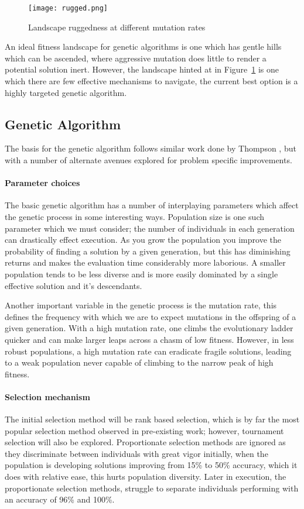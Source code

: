 \begin{figure}
	\centering
	\texttt{[image: rugged.png]}
	\caption{Landscape ruggedness at different mutation rates}
	\label{fig:rugged}
\end{figure}

An ideal fitness landscape for genetic algorithms is one which has gentle hills
which can be ascended, where aggressive mutation does little to render a potential
solution inert. However, the landscape hinted at in Figure~\ref{fig:rugged} is
one which there are few effective mechanisms to navigate, the current best option
is a highly targeted genetic algorithm.

\subsection{Genetic Algorithm \label{ss:g_a}}

The basis for the genetic algorithm follows similar work done by Thompson
\cite{10.1007/3-540-63173-9_61}, but with a number of alternate avenues explored
for problem specific improvements.

\paragraph{Parameter choices}
The basic genetic algorithm has a number of interplaying parameters which affect the genetic
process in some interesting ways. Population size is one such parameter which we must consider;
the number of individuals in each generation can drastically effect execution. As you grow the
population you improve the probability of finding a solution by a given generation, but this has
diminishing returns and makes the evaluation time considerably more laborious. A smaller population
tends to be less diverse and is more easily dominated by a single effective solution
and it's descendants.

Another important variable in the genetic process is the mutation rate, this defines the
frequency with which we are to expect mutations in the offspring of a given generation.
With a high mutation rate, one climbs the evolutionary ladder quicker and can make larger
leaps across a chasm of low fitness. However, in less robust populations, a high mutation rate
can eradicate fragile solutions, leading to a weak population never capable of
climbing to the narrow peak of high fitness.

\paragraph{Selection mechanism}
The initial selection method will be rank based selection, which is by far
the most popular selection method observed in pre-existing work; however,
tournament selection will also be explored. Proportionate selection
methods are ignored as they discriminate between individuals with great vigor initially,
when the population is developing solutions improving from 15\% to 50\%
accuracy, which it does with relative ease, this hurts population diversity.
Later in execution, the proportionate selection methods, struggle to separate individuals
performing with an accuracy of 96\% and 100\%.

